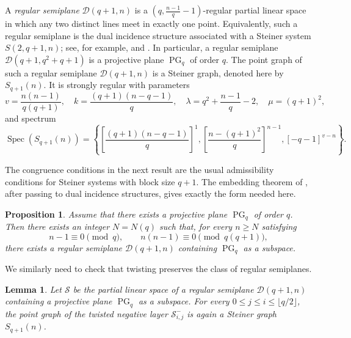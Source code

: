 \documentclass[reqno,a4paper,11pt]{article}
\newtheorem{lem}[thm]{Lemma}
\newtheorem{pro}[thm]{Proposition}
\theoremstyle{definition}
\theoremstyle{remark}
\DeclareMathOperator{\Spec}{Spec}
\newcommand{\PG}{\operatorname{PG}}
\begin{document}
A \emph{regular semiplane} $\mathcal{D}(q+1,n)$ is a $(q,\frac{n-1}{q}-1)$-regular partial linear space in which any two
distinct lines meet in exactly one point.
Equivalently, such a regular semiplane is the dual incidence structure
associated with a Steiner system \(S(2,q+1,n)\); see, for example,
\cite[Section~2]{NationSeffrood2011} and \cite[Chapter~I]{BJL1999}.
In particular, a regular semiplane  $\mathcal{D}(q+1,q^2+q+1)$ is a projective plane $\PG_q$ of order $q$. 
The point graph of such a regular semiplane $\mathcal{D}(q+1,n)$ is a Steiner graph, denoted
here by \(S_{q+1}(n)\).
It is strongly regular with parameters
\begin{equation}\label{parst}
 v=\frac{n(n-1)}{q(q+1)},\quad
 k=\frac{(q+1)(n-q-1)}{q},\quad
 \lambda=q^2+\frac{n-1}{q}-2,
 \quad
 \mu=(q+1)^2,
\end{equation}
and spectrum
\begin{equation}\label{specst}
\Spec(S_{q+1}(n))=
\left\{\left[\frac{(q+1)(n-q-1)}{q}\right]^1,
\left[\frac{n-(q+1)^2}{q}\right]^{n-1},
[-q-1]^{v-n}\right\}.
\end{equation}



The congruence conditions in the next result are the usual admissibility
conditions for Steiner systems with block size \(q+1\).  The embedding
theorem of \cite[Theorem~1.6]{DLEL2016}, after passing to dual incidence
structures, gives exactly the form needed here.

\begin{pro}\label{prop:semiplane-containing-projective-plane}
	Assume that there exists a projective plane \(\PG_q\) of order \(q\).
	Then there exists an integer \(N=N(q)\) such that, for every \(n\ge N\)
	satisfying
	\[
	n-1\equiv0\pmod q,
	\qquad
	n(n-1)\equiv0\pmod{q(q+1)},
	\]
	there exists a regular semiplane \(\mathcal D(q+1,n)\) containing
	\(\PG_q\) as a subspace.
\end{pro}

We similarly need to check that twisting preserves the class of regular
semiplanes.
\begin{lem}\label{lem:steiner-negative-layer}
	Let $\mathcal S$ be the partial linear space of a regular semiplane $\mathcal{D}(q+1,n)$ containing a projective plane $\PG_q$ as a subspace.
	For every $0\le j\le i\le \lfloor q/2\rfloor$, the point graph of the twisted negative layer $\mathcal S^-_{i,j}$ is again a Steiner graph  $S_{q+1}(n)$.
\end{lem}
\end{document}
